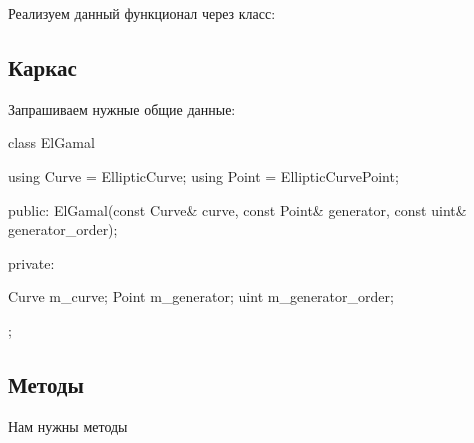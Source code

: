 Реализуем данный функционал через класс:
\subsection{Каркас}
Запрашиваем нужные общие данные:
\begin{cppcode}
class ElGamal {
    using Curve = EllipticCurve;
    using Point = EllipticCurvePoint;

public:
    ElGamal(const Curve& curve, const Point& generator, const uint& generator_order);

private:

    Curve m_curve;
    Point m_generator;
    uint m_generator_order;
};
\end{cppcode}
\subsection{Методы}
Нам нужны методы
